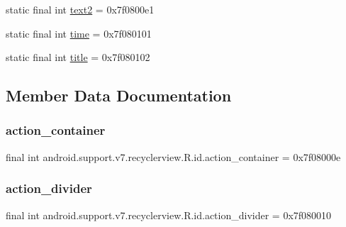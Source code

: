 \begin{DoxyCompactItemize}
\item 
static final int \mbox{\hyperlink{classandroid_1_1support_1_1v7_1_1recyclerview_1_1R_1_1id_a6e2b5d1ff0e263a6280932e2d572edb8}{text2}} = 0x7f0800e1
\item 
static final int \mbox{\hyperlink{classandroid_1_1support_1_1v7_1_1recyclerview_1_1R_1_1id_a45100a406d89b4edab15304790e2cdf9}{time}} = 0x7f080101
\item 
static final int \mbox{\hyperlink{classandroid_1_1support_1_1v7_1_1recyclerview_1_1R_1_1id_ad991ba2a84a04eae17e80bf0149e4e36}{title}} = 0x7f080102
\end{DoxyCompactItemize}


\subsection{Member Data Documentation}
\mbox{\label{classandroid_1_1support_1_1v7_1_1recyclerview_1_1R_1_1id_a98a2b7ea76095687895566393269cfd3}} 
\subsubsection{\texorpdfstring{action\+\_\+container}{action\_container}}
{\footnotesize\ttfamily final int android.\+support.\+v7.\+recyclerview.\+R.\+id.\+action\+\_\+container = 0x7f08000e\hspace{0.3cm}{\ttfamily [static]}}

\mbox{\label{classandroid_1_1support_1_1v7_1_1recyclerview_1_1R_1_1id_a354e0bf2908e96cfc50a29d5ce3f4f72}} 
\subsubsection{\texorpdfstring{action\+\_\+divider}{action\_divider}}
{\footnotesize\ttfamily final int android.\+support.\+v7.\+recyclerview.\+R.\+id.\+action\+\_\+divider = 0x7f080010\hspace{0.3cm}{\ttfamily [static]}}

